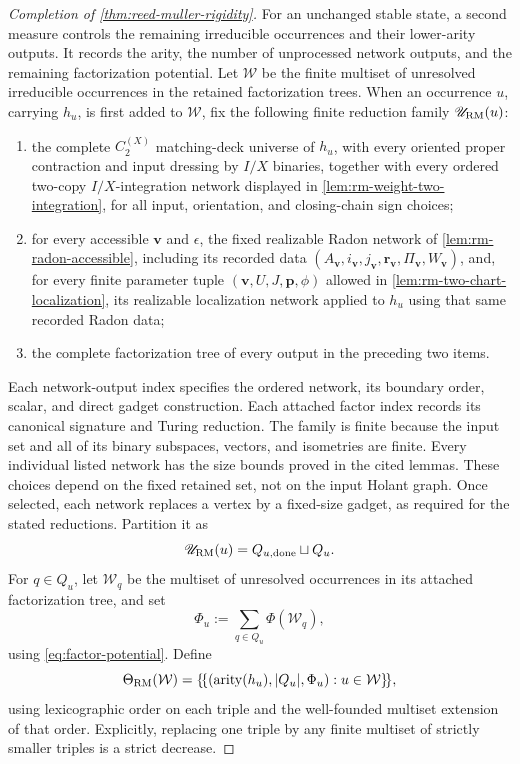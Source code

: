 \documentclass[11pt,letterpaper,onecolumn]{article}
\theoremstyle{plain}
\theoremstyle{definition}
\theoremstyle{remark}
\newcommand{\CycX}[1]{{C_{#1}^{(X)}}}
\newcommand{\arity}{\operatorname{arity}}
\begin{document}
\begin{proof}[Completion of \cref{thm:reed-muller-rigidity}]
For an unchanged stable state, a second measure controls the remaining
irreducible occurrences and their lower-arity outputs. It records the
arity, the number of unprocessed network outputs, and the remaining
factorization potential. Let \(\mathcal W\) be the finite multiset of
unresolved irreducible occurrences in the retained factorization trees.
When an occurrence \(u\), carrying \(h_u\), is first added to
\(\mathcal W\), fix the following finite reduction family
\(\mathscr U_{\rm RM}(u)\):
\begin{enumerate}
\item the complete \(\CycX{2}\) matching-deck universe of \(h_u\), with
      every oriented proper contraction and input dressing by \(I/X\) binaries, together
      with every ordered two-copy \(I/X\)-integration network displayed in
      \cref{lem:rm-weight-two-integration}, for all input, orientation, and
      closing-chain sign choices;
\item for every accessible \({\mathbf{v}}\) and \(\epsilon\), the fixed realizable Radon
      network of \cref{lem:rm-radon-accessible}, including its recorded
      data \((A_{\mathbf{v}},i_{\mathbf{v}},j_{\mathbf{v}},{\mathbf{r}}_{\mathbf{v}},\Pi_{\mathbf{v}},W_{\mathbf{v}})\), and, for every finite
      parameter tuple \(({\mathbf{v}},U,J,{\mathbf p},\phi)\) allowed in
      \cref{lem:rm-two-chart-localization}, its realizable localization network
      applied to \(h_u\) using that same recorded Radon data;
\item the complete factorization tree of every output in the preceding two
      items.
\end{enumerate}
Each network-output index specifies the ordered network, its boundary
order, scalar, and direct gadget construction. Each attached factor index
records its canonical signature and Turing reduction.  The
family is finite because the input set and
all of its binary subspaces, vectors, and isometries are finite. Every
individual listed network has the size bounds proved in the cited lemmas.
These choices depend on the fixed retained set, not on the
input Holant graph.  Once selected, each network replaces a vertex by a
fixed-size gadget, as required for the stated reductions.
Partition it as
\[
 \mathscr U_{\rm RM}(u)=Q_{u,\mathrm{done}}\sqcup Q_u.
\]
For \(q\in Q_u\), let \(\mathcal W_q\) be the multiset of unresolved occurrences in its attached factorization tree, and set
\[
 \Phi_u:=\sum_{q\in Q_u}\Phi(\mathcal W_q),
\]
using \cref{eq:factor-potential}.  Define
\[
 \Theta_{\rm RM}(\mathcal W)
 =
 \{\!\{(\arity(h_u),|Q_u|,\Phi_u):u\in\mathcal W\}\!\},
\]
using lexicographic order on each triple and the well-founded multiset
extension of that order. Explicitly, replacing one triple by any finite
multiset of strictly smaller triples is a strict decrease.


\end{proof}
\end{document}
